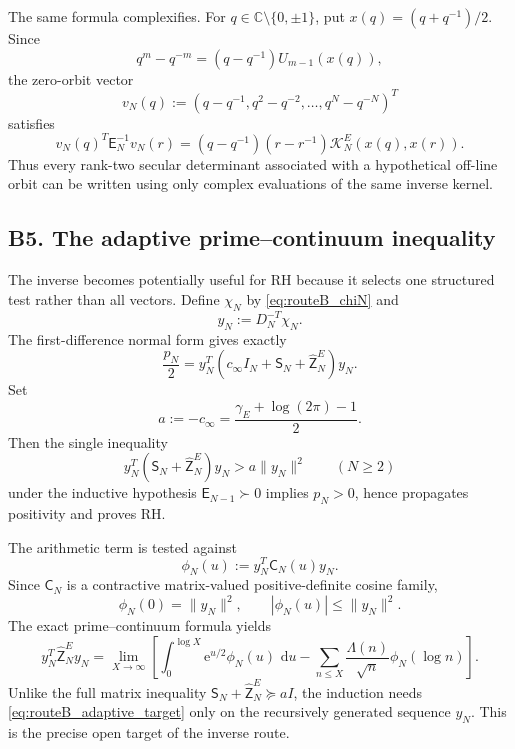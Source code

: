 \documentclass[11pt]{amsart}
\numberwithin{equation}{section}
\theoremstyle{plain}
\theoremstyle{definition}
\theoremstyle{remark}
\newcommand{\E}{\mathsf E}
\newcommand{\e}{\mathrm e}
\newcommand{\dd}{\,\mathrm d}
\begin{document}
The same formula complexifies.  For \(q\in\mathbb C\setminus\{0,\pm1\}\), put
\(x(q)=(q+q^{-1})/2\).  Since
\[
q^m-q^{-m}=(q-q^{-1})U_{m-1}(x(q)),
\]
the zero-orbit vector
\[
v_N(q):=(q-q^{-1},q^2-q^{-2},\ldots,q^N-q^{-N})^T
\]
satisfies
\begin{equation}
\boxed{
v_N(q)^T\E_N^{-1}v_N(r)
=
(q-q^{-1})(r-r^{-1})
\mathcal K_N^E(x(q),x(r)).}
\label{eq:routeB_complex_kernel}
\end{equation}
Thus every rank-two secular determinant associated with a hypothetical off-line orbit can be
written using only complex evaluations of the same inverse kernel.

\subsection{B5. The adaptive prime--continuum inequality}
\label{subsec:routeB_adaptive_prime}

The inverse becomes potentially useful for RH because it selects one structured test rather than all
vectors.  Define \(\chi_N\) by \eqref{eq:routeB_chiN} and
\begin{equation}
y_N:=D_N^{-T}\chi_N.
\label{eq:routeB_yN}
\end{equation}
The first-difference normal form gives exactly
\begin{equation}
\boxed{
\frac{p_N}{2}
=
y_N^T
\left(
c_\infty I_N+\mathsf S_N+\widehat{\mathsf Z}_N^E
\right)y_N.}
\label{eq:routeB_pivot_normal_form}
\end{equation}
Set
\[
a:=-c_\infty
=\frac{\gamma_E+\log(2\pi)-1}{2}.
\]
Then the single inequality
\begin{equation}
\boxed{
y_N^T(\mathsf S_N+\widehat{\mathsf Z}_N^E)y_N
>
a\|y_N\|^2
\qquad(N\ge2)}
\label{eq:routeB_adaptive_target}
\end{equation}
under the inductive hypothesis \(\E_{N-1}\succ0\) implies \(p_N>0\), hence propagates
positivity and proves RH.

The arithmetic term is tested against
\begin{equation}
\phi_N(u):=y_N^T\mathsf C_N(u)y_N.
\label{eq:routeB_phiN}
\end{equation}
Since \(\mathsf C_N\) is a contractive matrix-valued positive-definite cosine family,
\begin{equation}
\phi_N(0)=\|y_N\|^2,
\qquad
|\phi_N(u)|\le\|y_N\|^2.
\label{eq:routeB_phi_constraints}
\end{equation}
The exact prime--continuum formula yields
\begin{equation}
y_N^T\widehat{\mathsf Z}_N^Ey_N
=
\lim_{X\to\infty}
\left[
\int_0^{\log X}\e^{u/2}\phi_N(u)\,\dd u
-
\sum_{n\le X}\frac{\Lambda(n)}{\sqrt n}\phi_N(\log n)
\right].
\label{eq:routeB_adaptive_discrepancy}
\end{equation}
Unlike the full matrix inequality
\(\mathsf S_N+\widehat{\mathsf Z}_N^E\succeq aI\), the induction needs
\eqref{eq:routeB_adaptive_target} only on the recursively generated sequence \(y_N\).
This is the precise open target of the inverse route.
\end{document}
